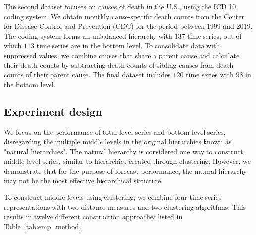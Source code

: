 \documentclass[a4paper,review,12pt,authoryear]{elsarticle}
\begin{document}
The second dataset focuses on causes of death in the U.S., using the ICD 10 coding system. We obtain monthly cause-specific death counts from the Center for Disease Control and Prevention (CDC) for the period between 1999 and 2019. The coding system forms an unbalanced hierarchy with $137$ time series, out of which $113$ time series are in the bottom level. To consolidate data with suppressed values, we combine causes that share a parent cause and calculate their death counts by subtracting death counts of sibling causes from death counts of their parent cause. The final dataset includes $120$ time series with $98$ in the bottom level.

\subsection{Experiment design}

We focus on the performance of total-level series and bottom-level series, disregarding the multiple middle levels in the original hierarchies known as "natural hierarchies". The natural hierarchy is considered one way to construct middle-level series, similar to hierarchies created through clustering. However, we demonstrate that for the purpose of forecast performance, the natural hierarchy may not be the most effective hierarchical structure.

To construct middle levels using clustering, we combine four time series representations with two distance measures and two clustering algorithms. This results in twelve different construction approaches listed in Table~\ref{tab:emp_method}.
\end{document}
